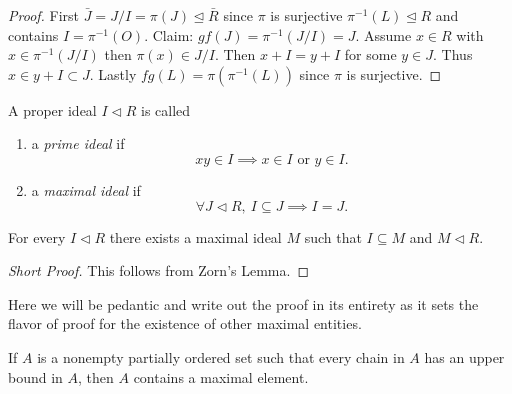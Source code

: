 \documentclass[master.tex]{subfiles}
\begin{document}
\begin{proof}
  First \(\bar{J}=J/I=\pi(J)\unlhd \bar{R}\) since \(\pi\) is surjective \(\pi^{-1}(L) \unlhd R\) and contains
  \(I=\pi^{-1}(O)\). Claim: \(gf(J)=\pi^{-1}(J/I)=J\). Assume \(x \in R\) with \(x \in \pi^{-1}(J/I)\) then
  \(\pi(x) \in J/I\). Then \(x+I=y+I\) for some \(y \in J\). Thus \(x \in y + I \subset J\). Lastly
  \(fg(L)=\pi(\pi^{-1}(L))\) since \(\pi\) is surjective.
\end{proof}

\begin{defn}
  A proper ideal \(I \lhd R\) is called
  \begin{enumerate}
  \item a \emph{prime ideal} if
    \[xy \in I \implies x \in I \text{ or } y \in I.\]
  \item a \emph{maximal ideal} if
    \[\forall J \lhd R,\ I \subseteq J \implies I=J.\]
  \end{enumerate}
\end{defn}

\begin{prop}
  For every \(I \lhd R\) there exists a maximal ideal \(M\) such that \(I \subseteq M\) and \(M \lhd R\).
\end{prop}

\begin{proof}[Short Proof]
  This follows from Zorn's Lemma.
\end{proof}

Here we will be pedantic and write out the proof in its entirety as it sets the flavor of proof for the existence of
other maximal entities.

\begin{lem*}
  If \(A\) is a nonempty partially ordered set such that every chain in \(A\) has an upper bound in \(A\), then \(A\)
  contains a maximal element.
\end{lem*}
\end{document}
